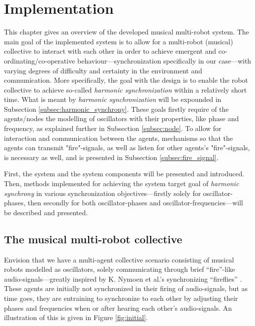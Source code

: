 \chapter{Implementation}
This chapter gives an overview of the developed musical multi-robot system. The main goal of the implemented system is to allow for a multi-robot (musical) collective to interact with each other in order to achieve emergent and co-ordinating/co-operative behaviour—synchronization specifically in our case—with varying degrees of difficulty and certainty in the environment and communication. More specifically, the goal with the design is to enable the robot collective to achieve so-called \textit{harmonic synchronization} within a relatively short time. What is meant by \textit{harmonic synchronization} will be expounded in Subsection \ref{subsec:harmonic_synchrony}. These goals firstly require of the agents/nodes the modelling of oscillators with their properties, like phase and frequency, as explained further in Subsection \ref{subsec:node}. To allow for interaction and communication between the agents, mechanisms so that the agents can transmit "fire"-signals, as well as listen for other agents's "fire"-signals, is necessary as well, and is presented in Subsection \ref{subsec:fire_signal}.

First, the system and the system components will be presented and introduced. Then, methods implemented for achieving the system target goal of \textit{harmonic synchrony} in various synchronization objectives—firstly solely for oscillator-phases, then secondly for both oscillator-phases and oscillator-frequencies—will be described and presented.




\section{The musical multi-robot collective}
\label{sec:developed_system}

	Envision that we have a multi-agent collective scenario consisting of musical robots modelled as oscillators, solely communicating through brief ``fire''-like audio-signals—greatly inspired by K. Nymoen et al.'s synchronizing ``fireflies'' \cite{nymoen_synch}. These agents are initially not synchronized in their firing of audio-signals, but as time goes, they are entraining to synchronize to each other by adjusting their phases and frequencies when or after hearing each other's audio-signals. An illustration of this is given in Figure \ref{fig:initial}.


